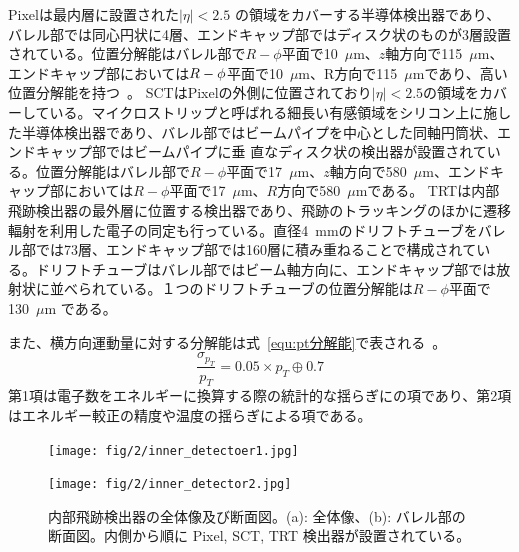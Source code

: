 Pixelは最内層に設置された$|\eta| < 2.5$ の領域をカバーする半導体検出器であり、バレル部では同心円状に4層、エンドキャップ部ではディスク状のものが3層設置されている。位置分解能はバレル部で$R-\phi$平面で10~$\mu$m、$z$軸方向で115~$\mu$m、エンドキャップ部においては$R-\rm{\phi}$平面で10~$\mu$m、R方向で115~$\mu$mであり、高い位置分解能を持つ~\cite{Aad:1129811}。
SCTはPixelの外側に位置されており$|\eta| < 2.5$の領域をカバーしている。マイクロストリップと呼ばれる細長い有感領域をシリコン上に施した半導体検出器であり、バレル部ではビームパイプを中心とした同軸円筒状、エンドキャップ部ではビームパイプに垂
直なディスク状の検出器が設置されている。位置分解能はバレル部で$R-\phi$平面で17~$\mu$m、$z$軸方向で580~$\mu$m、エンドキャップ部においては$R-\phi$平面で17~$\mu$m、$R$方向で580~$\mu$mである\cite{Aad:1129811}。
TRTは内部飛跡検出器の最外層に位置する検出器であり、飛跡のトラッキングのほかに遷移輻射を利用した電子の同定も行っている。直径4~mmのドリフトチューブをバレル部では73層、エンドキャップ部では160層に積み重ねることで構成されている。ドリフトチューブはバレル部ではビーム軸方向に、エンドキャップ部では放射状に並べられている。１つのドリフトチューブの位置分解能は$R-\phi$平面で130~$\mu$m である。

また、横方向運動量に対する分解能は式~\eqref{equ:pt分解能}で表される~\cite{Aad:1129811}。
\begin{equation}
    \frac{\sigma_{p_{T}}}{p_{T}} = 0.05\times p_{T}\oplus 0.7 
　\label{equ:pt分解能}
\end{equation}
第1項は電子数をエネルギーに換算する際の統計的な揺らぎにの項であり、第2項はエネルギー較正の精度や温度の揺らぎによる項である。

\begin{figure}
    \centering
    \begin{minipage}[b]{0.4\linewidth}
        \centering
        \hspace*{-1cm}
        \texttt{[image: fig/2/inner\_detectoer1.jpg]}
        \vspace{10pt}
        \subcaption{}
        \label{fig:内部飛跡検出器の概略図1}
    \end{minipage}
    \hfill
    \begin{minipage}[b]{0.5\linewidth}
        \centering
        \texttt{[image: fig/2/inner\_detector2.jpg]}
        \vspace{10pt}
        \subcaption{}
        \label{fig:内部飛跡検出器の概略図2}
    \end{minipage}
    \caption{内部飛跡検出器の全体像及び断面図。(a): 全体像\cite{Aad:1129811}、(b): バレル部の断面図\cite{Collaboration:2723878}。内側から順に Pixel, SCT, TRT 検出器が設置されている。}
    \label{fig:内部飛跡検出器}
\end{figure}



